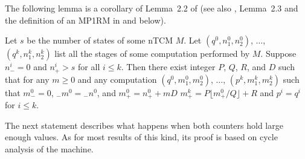 \documentclass[12pt]{article}
\begin{document}
The following lemma is a corollary of Lemma~2.2 of \cite{ibarra} (see
also \cite{ibarra}, Lemma~2.3 and the definition of an MP1RM in \cite{Schroep} and below).
\begin{lemma}\label{linper}
Let $s$ be the number of states of some nTCM $M$. Let $(q^0, n^0_1,
n^0_2)$, $\ldots$, $(q^k, n^k_1, n^k_2)$ list all the stages of some computation
performed by $M$. Suppose $n^i_-=0$ and $n^i_+>s$ for all $i\leq k$. 
Then there exist integer $P$, $Q$, $R$, and $D$ such that for any
$m\geq0$ and any computation $(q^0, m^0_1, m^0_2)$, $\ldots$, $(p^k, m^k_1,
m^k_2)$ such that $m^0_-=0$, ${}_-m^0={}_-n^0$, and $m^0_+=n^0_++mD$ $m^k_+=P\lfloor
m^0_+/Q\rfloor+R$ and $p^i=q^i$ for $i\leq k$.
\end{lemma}

The next statement describes what happens when both counters hold
large enough values. As for most results of this kind, its proof is
based on cycle analysis of the machine. 
\end{document}
